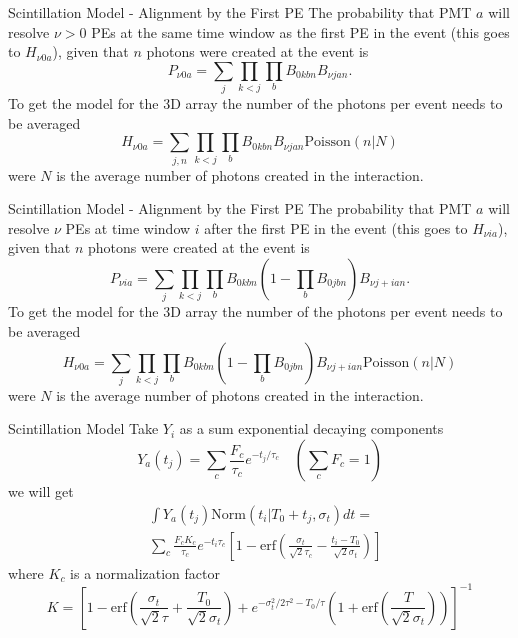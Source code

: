 \documentclass{beamer}
\begin{document}
\begin{frame}{Scintillation Model - Alignment by the First PE}
The probability that PMT $a$ will resolve $\nu>0$ PEs at the same time window as the first PE in the event (this goes to $H_{\nu0a}$), given that $n$ photons were created at the event is
\begin{equation}
P_{\nu0a}=\sum_j\prod_{k<j}\prod_bB_{0kbn}B_{\nu jan}.
\end{equation}
To get the model for the 3D array the number of the photons per event needs to be averaged
\begin{equation}
H_{\nu0a}=\sum_{j,n}\prod_{k<j}\prod_bB_{0kbn}B_{\nu jan}\text{Poisson}(n|N)
\end{equation}
were $N$ is the average number of photons created in the interaction.
\end{frame}

\begin{frame}{Scintillation Model - Alignment by the First PE}
The probability that PMT $a$ will resolve $\nu$ PEs at time window $i$ after the first PE in the event (this goes to $H_{\nu ia}$), given that $n$ photons were created at the event is
\begin{equation}
P_{\nu ia}=\sum_j\prod_{k<j}\prod_bB_{0kbn}(1-\prod_bB_{0jbn})B_{\nu j+ian}.
\end{equation}
To get the model for the 3D array the number of the photons per event needs to be averaged
\begin{equation}
H_{\nu0a}=\sum_j\prod_{k<j}\prod_bB_{0kbn}(1-\prod_bB_{0jbn})B_{\nu j+ian}\text{Poisson}(n|N)
\end{equation}
were $N$ is the average number of photons created in the interaction.
\end{frame}

\begin{frame}{Scintillation Model}
Take $Y_i$ as a sum exponential decaying components
\begin{equation}
Y_a(t_j)=\sum_c\frac{F_c}{\tau_c}e^{-t_j/\tau_c} \quad (\sum_cF_c=1)
\end{equation}
we will get 
\begin{equation}
\begin{split}
&\int Y_a(t_j)\text{Norm}(t_i|T_0+t_j, \sigma_t)dt=\\
&\sum_c\frac{F_cK_c}{\tau_c}e^{-t_i\tau_c}\left[1-\text{erf}\left(\frac{\sigma_t}{\sqrt{2}\tau_c}-\frac{t_i-T_0}{\sqrt{2}\sigma_t}\right)\right]
\end{split}
\end{equation}
where $K_c$ is a normalization factor
\begin{equation}
K=\left[1-\text{erf}\left(\frac{\sigma_t}{\sqrt{2}\tau}+\frac{T_0}{\sqrt{2}\sigma_t}\right)+e^{-\sigma_t^2/2\tau^2-T_0/\tau}\left(1+\text{erf}\left(\frac{T}{\sqrt{2}\sigma_t}\right)\right)\right]^{-1}
\end{equation}
\end{frame}
\end{document}
